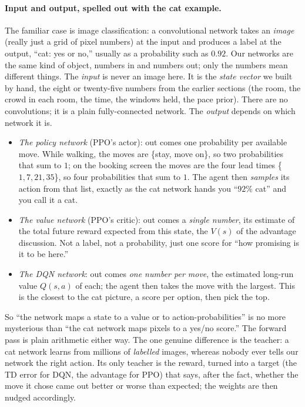 \documentclass[11pt]{article}
\newcommand{\key}[1]{\textit{#1}}            %
\begin{document}
\paragraph{Input and output, spelled out with the cat example.} The familiar case is image
classification: a convolutional network takes an \emph{image} (really just a grid of pixel numbers) at
the input and produces a label at the output, ``cat: yes or no,'' usually as a probability such as
$0.92$. Our networks are the same kind of object, numbers in and numbers out; only the numbers mean
different things. The \emph{input} is never an image here. It is the \key{state vector} we built by hand,
the eight or twenty-five numbers from the earlier sections (the room, the crowd in each room, the time,
the windows held, the pace prior). There are no convolutions; it is a plain fully-connected network. The
\emph{output} depends on which network it is.
\begin{itemize}[leftmargin=1.4em,itemsep=2pt]
\item \emph{The policy network} (PPO's actor): out comes one probability per available move. While
walking, the moves are \{stay, move on\}, so two probabilities that sum to $1$; on the booking screen the
moves are the four lead times \{$1,7,21,35$\}, so four probabilities that sum to $1$. The agent then
\emph{samples} its action from that list, exactly as the cat network hands you ``$92\%$ cat'' and you
call it a cat.
\item \emph{The value network} (PPO's critic): out comes a \emph{single number}, its estimate of the
total future reward expected from this state, the $V(s)$ of the advantage discussion. Not a label, not a
probability, just one score for ``how promising is it to be here.''
\item \emph{The DQN network}: out comes \emph{one number per move}, the estimated long-run value
$Q(s,a)$ of each; the agent then takes the move with the largest. This is the closest to the cat
picture, a score per option, then pick the top.
\end{itemize}
So ``the network maps a state to a value or to action-probabilities'' is no more mysterious than ``the
cat network maps pixels to a yes/no score.'' The forward pass is plain arithmetic either way. The one
genuine difference is the teacher: a cat network learns from millions of \emph{labelled} images, whereas
nobody ever tells our network the right action. Its only teacher is the reward, turned into a target (the
TD error for DQN, the advantage for PPO) that says, after the fact, whether the move it chose came out
better or worse than expected; the weights are then nudged accordingly.
\end{document}
